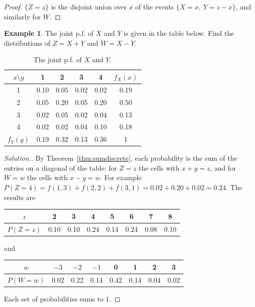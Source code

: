 \documentclass[12pt,a4paper]{report}
\theoremstyle{definition}
\newtheorem{example}[thm]{Example}
\theoremstyle{plain}
\newenvironment{solution}
  {\renewcommand{\qedsymbol}{}\begin{proof}[\textit{Solution}.]}
  {\end{proof}}
\begin{document}
\begin{proof}
$\{Z = z\}$ is the disjoint union over $x$ of the events
$\{X = x,\ Y = z - x\}$, and similarly for $W$.
\end{proof}

\begin{example}
\label{ex:discretesum}
The joint p.f. of $X$ and $Y$ is given in the table below. Find the distributions
of $Z = X + Y$ and $W = X - Y$.
\begin{table}[H]
\centering
\begin{tabular}{c|cccc|c}
$x\setminus y$ & 1 & 2 & 3 & 4 & $f_X(x)$\\
\hline
1 & 0.10 & 0.05 & 0.02 & 0.02 & 0.19\\
2 & 0.05 & 0.20 & 0.05 & 0.20 & 0.50\\
3 & 0.02 & 0.05 & 0.02 & 0.04 & 0.13\\
4 & 0.02 & 0.02 & 0.04 & 0.10 & 0.18\\
\hline
$f_Y(y)$ & 0.19 & 0.32 & 0.13 & 0.36 & 1\\
\end{tabular}
\caption{The joint p.f. of $X$ and $Y$.}
\label{tab:discretesum}
\end{table}
\end{example}

\begin{solution}
By Theorem~\ref{thm:sumdiscrete}, each probability is the sum of the entries on a
diagonal of the table: for $Z = z$ the cells with $x + y = z$, and for $W = w$ the
cells with $x - y = w$. For example
$P(Z = 4) = f(1,3) + f(2,2) + f(3,1) = 0.02 + 0.20 + 0.02 = 0.24$. The results
are
\begin{table}[H]
\centering
\begin{tabular}{|c|ccccccc|}
\hline
$z$ & 2 & 3 & 4 & 5 & 6 & 7 & 8\\
\hline
$P(Z = z)$ & 0.10 & 0.10 & 0.24 & 0.14 & 0.24 & 0.08 & 0.10\\
\hline
\end{tabular}
\end{table}
and
\begin{table}[H]
\centering
\begin{tabular}{|c|ccccccc|}
\hline
$w$ & $-3$ & $-2$ & $-1$ & 0 & 1 & 2 & 3 \\
\hline
$P(W = w)$ & 0.02 & 0.22 & 0.14 & 0.42 & 0.14 & 0.04 & 0.02\\
\hline
\end{tabular}
\end{table}
Each set of probabilities sums to $1$.
\end{solution}
\end{document}
